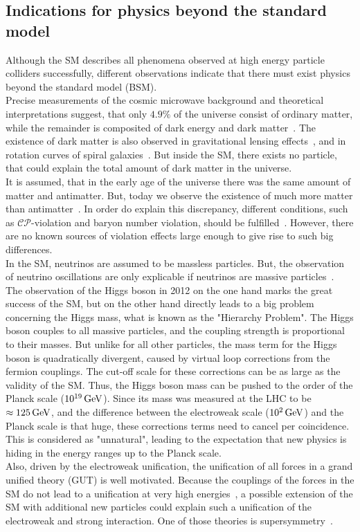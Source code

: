 \subsection{Indications for physics beyond the standard model}\label{sec:SM_bsm}
Although the SM describes all phenomena observed at high energy particle colliders successfully, different observations indicate that there must exist physics beyond the standard model (BSM).\\
Precise measurements of the cosmic microwave background and theoretical interpretations suggest, that only $4.9\%$ of the universe consist of ordinary matter, while the remainder is composited of dark energy and dark matter~\cite{DarkMatterPlanck}. The existence of dark matter is also observed in gravitational lensing effects~\cite{DarkMatterLensing}, and in rotation curves of spiral galaxies~\cite{DarkMatterRotation}. But inside the SM, there exists no particle, that could explain the total amount of dark matter in the universe.\\
It is assumed, that in the early age of the universe there was the same amount of matter and antimatter. But, today we observe the existence of much more matter than antimatter~\cite{Antimatter,AsymSM}. In order do explain this discrepancy, different conditions, such as $\mathcal{CP}$-violation and baryon number violation, should be fulfilled~\cite{Sakharov}. However, there are no known sources of violation effects large enough to give rise to such big differences.\\
In the SM, neutrinos are assumed to be massless particles. But, the observation of neutrino oscillations are only explicable if neutrinos are massive particles~\cite{NeutrinoMass,PDG}.\\
The observation of the Higgs boson in 2012 on the one hand marks the great success of the SM, but on the other hand directly leads to a big problem concerning the Higgs mass, what is known as the "Hierarchy Problem". The Higgs boson couples to all massive particles, and the coupling strength is proportional to their masses. But unlike for all other particles, the mass term for the Higgs boson is quadratically divergent, caused by virtual loop corrections from the fermion couplings. The cut-off scale for these corrections can be as large as the validity of the SM. Thus, the Higgs boson mass can be pushed to the order of the Planck scale ($10^{19}\,\text{Ge\hspace{-.08em}V}$). Since its mass was measured at the LHC to be $\approx 125\,\text{Ge\hspace{-.08em}V}$, and the difference between the electroweak scale ($10^2\,\text{Ge\hspace{-.08em}V}$) and the Planck scale is that huge, these corrections terms need to cancel per coincidence. This is considered as "unnatural", leading to the expectation that new physics is hiding in the energy ranges up to the Planck scale.\\
Also, driven by the electroweak unification, the unification of all forces in a grand unified theory (GUT) is well motivated. Because the couplings of the forces in the SM do not lead to a unification at very high energies~\cite{PDG}, a possible extension of the SM with additional new particles could explain such a unification of the electroweak and strong interaction. One of those theories is supersymmetry~\cite{SUSYOriginal}.


